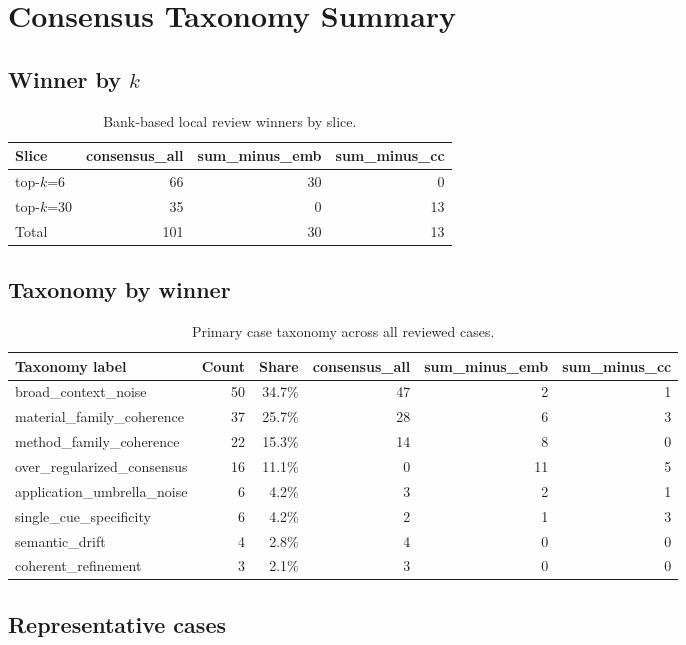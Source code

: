 \section{Consensus Taxonomy Summary}

\subsection{Winner by $k$}
\begin{table}[t]
\centering
\begin{tabular}{lrrr}
\hline
Slice & consensus\_all & sum\_minus\_emb & sum\_minus\_cc \\
\hline
top-$k$=6 & 66 & 30 & 0 \\
top-$k$=30 & 35 & 0 & 13 \\
Total & 101 & 30 & 13 \\
\hline
\end{tabular}
\caption{Bank-based local review winners by slice.}
\end{table}

\subsection{Taxonomy by winner}
\begin{table}[t]
\centering
\begin{tabular}{lrrrrr}
\hline
Taxonomy label & Count & Share & consensus\_all & sum\_minus\_emb & sum\_minus\_cc \\
\hline
broad\_context\_noise & 50 & 34.7\% & 47 & 2 & 1 \\
material\_family\_coherence & 37 & 25.7\% & 28 & 6 & 3 \\
method\_family\_coherence & 22 & 15.3\% & 14 & 8 & 0 \\
over\_regularized\_consensus & 16 & 11.1\% & 0 & 11 & 5 \\
application\_umbrella\_noise & 6 & 4.2\% & 3 & 2 & 1 \\
single\_cue\_specificity & 6 & 4.2\% & 2 & 1 & 3 \\
semantic\_drift & 4 & 2.8\% & 4 & 0 & 0 \\
coherent\_refinement & 3 & 2.1\% & 3 & 0 & 0 \\
\hline
\end{tabular}
\caption{Primary case taxonomy across all reviewed cases.}
\end{table}

\subsection{Representative cases}
